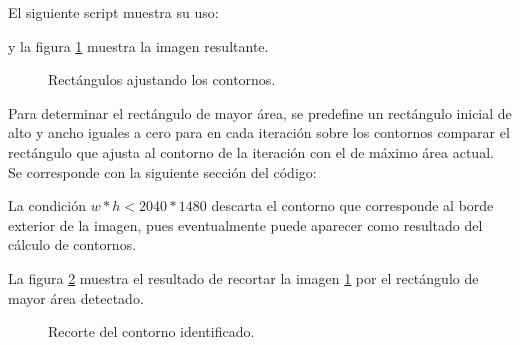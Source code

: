 \documentclass[a4paper,12pt]{article}
\begin{document}
El siguiente script muestra su uso:

y la figura \ref{fig:img3} muestra la imagen resultante.

\begin{figure}[h!]
\centering
{}
\caption{Rectángulos ajustando los contornos.}
\label{fig:img3}
\end{figure}
Para determinar el rectángulo de mayor área, se predefine un rectángulo inicial de alto y ancho iguales a cero para en cada iteración sobre los contornos comparar el rectángulo que ajusta al contorno de la iteración con el de máximo área actual. Se corresponde con la siguiente sección del código:

La condición $w*h<2040*1480$ descarta el contorno que corresponde al borde exterior de la imagen, pues eventualmente puede aparecer como resultado del cálculo de contornos.

La figura \ref{fig:img3Rect} muestra el resultado de recortar la imagen \ref{fig:img3} por el rectángulo de mayor área detectado.

\begin{figure}[h!]
\centering
{}
\caption{Recorte del contorno identificado.}
\label{fig:img3Rect}
\end{figure}
\end{document}
